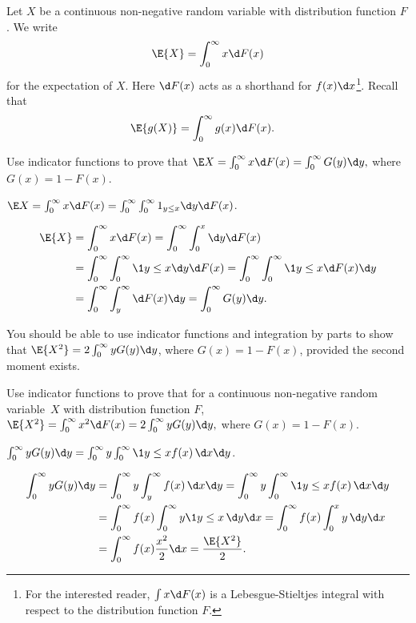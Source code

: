 Let $X$ be a continuous non-negative random variable with distribution function $F$.  We write 
\begin{equation*}
  \E{X} = \int_0^\infty x \d F(x)
\end{equation*}
for the expectation of $X$. Here $\d F(x)$ acts as a shorthand for $f(x) \d x$\footnote{For the interested reader, $\int x \d F(x)$ is a Lebesgue-Stieltjes integral with respect to the distribution function $F$.}. Recall that
\begin{align*}
\E{g(X)} &= \int_0^\infty g(x) \d F(x).
\end{align*}



\begin{exercise}
 Use indicator functions to prove that 
$   \E X = \int_0^\infty x \d F(x)  = \int_0^\infty G(y) \d y,$
where $G(x) = 1 - F(x)$. 
\begin{hint}
$\E X = \int_0^\infty x \d F(x)  = \int_0^\infty \int_0^\infty 1_{y\leq x} \d y \d F(x)$.
\end{hint}
\begin{solution}
  \begin{align*}
    \E{X} &= \int_0^\infty x \d F(x)  = \int_0^\infty \int_0^x \d y \d F(x) \\
    & = \int_0^\infty \int_0^\infty \1{y\leq x} \d y \d F(x)   = \int_0^\infty \int_0^\infty \1{y\leq x} \d F(x) \d y\\
    & = \int_0^\infty \int_y^\infty \d F(x) \d y = \int_0^\infty G(y) \d y.
  \end{align*}
\end{solution}
\end{exercise}

You should be able to use indicator functions and integration by parts to show that $\E{X^2} = 2\int_0^\infty y G(y) \d y$, where $G(x) = 1- F(x)$, provided the second moment exists.

\begin{extra}
  Use indicator functions to prove that for a continuous non-negative random variable~$X$ with distribution function $F$, $ \E{X^2} = \int_0^\infty x^2 \d F(x) = 2 \int_0^\infty y G(y) \d y,$ where $G(x) = 1 - F(x)$.
\begin{hint}
$\int_0^\infty y G(y) \d y = \int_0^\infty y \int_0^\infty \1{y\leq x}f(x)\, \d x \d y$.
\end{hint}
\begin{solution}
  \begin{align*}
\int_0^\infty y G(y) \d y 
&=  \int_0^\infty y \int_y^\infty f(x)\, \d x \d y =  \int_0^\infty y \int_0^\infty \1{y\leq x}f(x)\, \d x \d y\\
&=  \int_0^\infty f(x) \int_0^\infty y \1{y \leq x}\, \d y \d x
=  \int_0^\infty f(x) \int_0^x y\, \d y \d x\\
&=  \int_0^\infty f(x) \frac{x^2}2 \d x =\frac{\E{X^2}}2.
  \end{align*}
\end{solution}
\end{extra}

